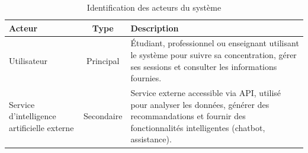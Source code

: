 \begin{table}[H]
\centering
\renewcommand{\arraystretch}{1.5}
\setlength{\tabcolsep}{8pt}

\begin{tabularx}{\textwidth}{|>{\raggedright\arraybackslash}p{4cm}|c|>{\raggedright\arraybackslash}X|}
\hline
\textbf{Acteur} & \textbf{Type} & \textbf{Description} \\
\hline

Utilisateur 
& Principal 
& Étudiant, professionnel ou enseignant utilisant le système pour suivre sa concentration, gérer ses sessions et consulter les informations fournies. \\
\hline

Service d’intelligence artificielle externe 
& Secondaire 
& Service externe accessible via API, utilisé pour analyser les données, générer des recommandations et fournir des fonctionnalités intelligentes (chatbot, assistance). \\
\hline

\end{tabularx}

\caption{Identification des acteurs du système}
\label{tab:acteurs}

\end{table}


